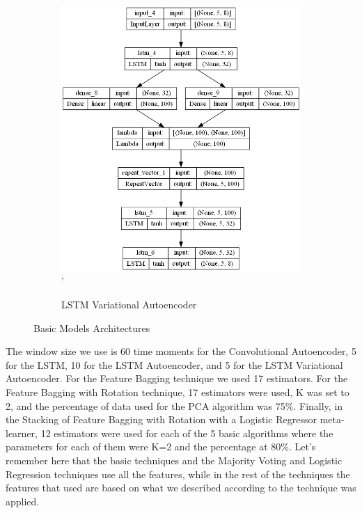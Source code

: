 \documentclass[a4paper,12pt]{report}
\theoremstyle{definitionNODot}
\begin{document}
\begin{figure}[H]
\begin{subfigure}[b]{0.5\textwidth}
			\includegraphics[width=\textwidth]{plot_model_lstm_vae_model.png}'
			\caption{LSTM Variational Autoencoder}
			\label{fig:plot_model_lstm_vae_model}
		\end{subfigure}
		
		\caption{Basic Models Architectures}
		\label{fig:plot_model_architecture_model}
	\end{figure}
	
	The window size we use is 60 time moments for the Convolutional Autoencoder, 5 for the LSTM, 10 for the LSTM Autoencoder, and 5 for the LSTM Variational Autoencoder. For the Feature Bagging technique we used 17 estimators. For the Feature Bagging with Rotation technique, 17 estimators were used, K was set to 2, and the percentage of data used for the PCA algorithm was 75\%. Finally, in the Stacking of Feature Bagging with Rotation with a Logistic Regressor meta-learner, 12 estimators were used for each of the 5 basic algorithms where the parameters for each of them were K=2 and the percentage at 80\%. Let's remember here that the basic techniques and the Majority Voting and Logistic Regression techniques use all the features, while in the rest of the techniques the features that used are based on what we described according to the technique was applied.
	
\end{document}
